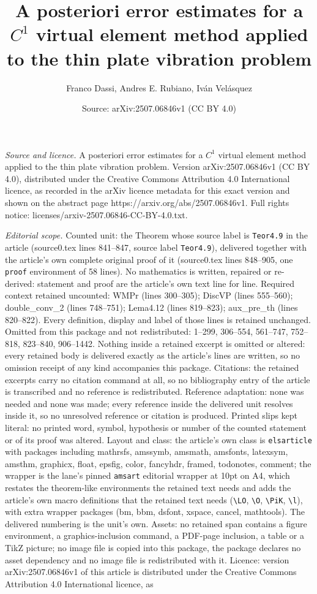 \documentclass[10pt,a4paper]{amsart}
\title[A posteriori error estimates for a $C^1$ virtual element met]{A posteriori error estimates for a $C^1$ virtual element method applied to the thin plate vibration problem}
\author{Franco Dassi, Andres E. Rubiano, Iv\'an Vel\'asquez}
\date{Source: arXiv:2507.06846v1 (CC BY 4.0)}
\begin{document}
\maketitle

\noindent\emph{Source and licence.} A posteriori error estimates for a $C^1$ virtual element method applied to the thin plate vibration problem. Version arXiv:2507.06846v1 (CC BY 4.0), distributed under the Creative Commons Attribution 4.0 International licence, as recorded in the arXiv licence metadata for this exact version and shown on the abstract page https://arxiv.org/abs/2507.06846v1. Full rights notice: licenses/arxiv-2507.06846-CC-BY-4.0.txt.\par\smallskip

\noindent\textit{Editorial scope.} Counted unit: the Theorem whose source label is \texttt{Teor4.9} in the article (source0.tex lines 841--847, source label \texttt{Teor4.9}), delivered together with the article's own complete original proof of it (source0.tex lines 848--905, one \texttt{proof} environment of 58 lines). No mathematics is written, repaired or re-derived: statement and proof are the article's own text line for line. Required context retained uncounted: WMPr (lines 300--305); DiscVP (lines 555--560); double\_conv\_2 (lines 748--751); Lema4.12 (lines 819--823); aux\_pre\_th (lines 820--822). Every definition, display and label of those lines is retained unchanged. Omitted from this package and not redistributed: 1--299, 306--554, 561--747, 752--818, 823--840, 906--1442. Nothing inside a retained excerpt is omitted or altered: every retained body is delivered exactly as the article's lines are written, so no omission receipt of any kind accompanies this package. Citations: the retained excerpts carry no citation command at all, so no bibliography entry of the article is transcribed and no reference is redistributed. Reference adaptation: none was needed and none was made; every reference inside the delivered unit resolves inside it, so no unresolved reference or citation is produced. Printed slips kept literal: no printed word, symbol, hypothesis or number of the counted statement or of its proof was altered. Layout and class: the article's own class is \texttt{elsarticle} with packages including mathrsfs, amssymb, amsmath, amsfonts, latexsym, amsthm, graphicx, float, epsfig, color, fancyhdr, framed, todonotes, comment; the wrapper is the lane's pinned \texttt{amsart} editorial wrapper at 10pt on A4, which restates the theorem-like environments the retained text needs and adds the article's own macro definitions that the retained text needs (\texttt{\textbackslash LO}, \texttt{\textbackslash O}, \texttt{\textbackslash PiK}, \texttt{\textbackslash l}), with extra wrapper packages (bm, bbm, dsfont, xspace, cancel, mathtools). The delivered numbering is the unit's own. Assets: no retained span contains a figure environment, a graphics-inclusion command, a PDF-page inclusion, a table or a TikZ picture; no image file is copied into this package, the package declares no asset dependency and no image file is redistributed with it. Licence: version arXiv:2507.06846v1 of this article is distributed under the Creative Commons Attribution 4.0 International licence, as 
\end{document}
